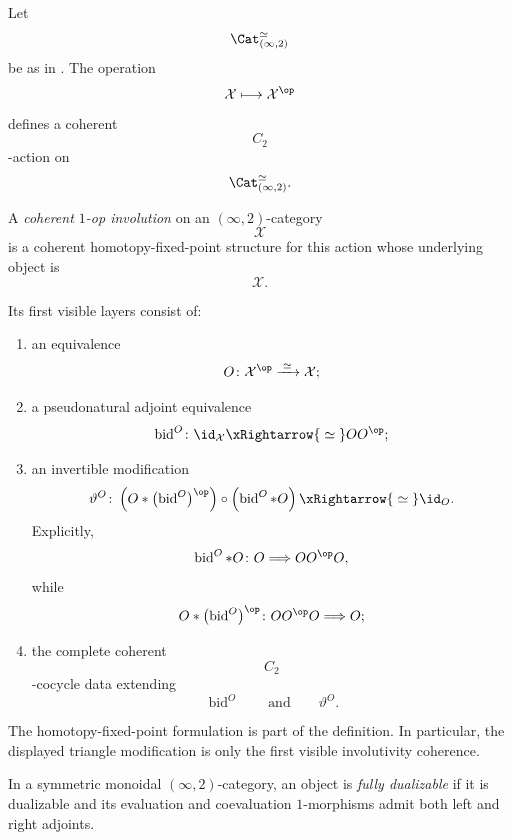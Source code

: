 \begin{definition}
\label{def:coherent-one-op-involution}
Let
\[
    \Cat_{(\infty,2)}^\simeq
\]
be as in
. The operation
\[
    \mathcal X
    \longmapsto
    \mathcal X^{\op}
\]
defines a coherent
\[
    C_2
\]
-action on
\[
    \Cat_{(\infty,2)}^\simeq.
\]

A \emph{coherent $1$-op involution} on an $(\infty,2)$-category
\[
    \mathcal X
\]
is a coherent homotopy-fixed-point structure for this action whose
underlying object is
\[
    \mathcal X.
\]

Its first visible layers consist of:
\begin{enumerate}[label=(\roman*)]
    \item an equivalence
    \[
        O
        \colon
        \mathcal X^{\op}
        \xrightarrow{\;\simeq\;}
        \mathcal X;
    \]

    \item a pseudonatural adjoint equivalence
    \[
        \operatorname{bid}^{O}
        \colon
        \id_{\mathcal X}
        \xRightarrow{\;\simeq\;}
        O O^{\op};
    \]

    \item an invertible modification
    \[
        \vartheta^{O}
        \colon
        \left(
            O\ast
            \bigl(
                \operatorname{bid}^{O}
            \bigr)^{\op}
        \right)
        \circ
        \left(
            \operatorname{bid}^{O}\ast O
        \right)
        \xRightarrow{\;\simeq\;}
        \id_O.
    \]
    Explicitly,
    \[
        \operatorname{bid}^{O}\ast O
        \colon
        O
        \Longrightarrow
        O O^{\op}O,
    \]
    while
    \[
        O\ast
        \bigl(
            \operatorname{bid}^{O}
        \bigr)^{\op}
        \colon
        O O^{\op}O
        \Longrightarrow
        O;
    \]

    \item the complete coherent
    \[
        C_2
    \]
    -cocycle data extending
    \[
        \operatorname{bid}^{O}
        \qquad\text{and}\qquad
        \vartheta^{O}.
    \]
\end{enumerate}

The homotopy-fixed-point formulation is part of the definition. In
particular, the displayed triangle modification is only the first
visible involutivity coherence.
\end{definition}

\begin{convention}
\label{conv:morita-full-dualizability}
In a symmetric monoidal $(\infty,2)$-category, an object is
\emph{fully dualizable} if it is dualizable and its evaluation and
coevaluation $1$-morphisms admit both left and right adjoints.
\end{convention}

